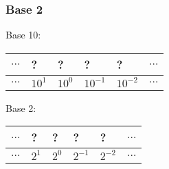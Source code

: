 \begin{frame}

\frametitle{Base 2}

\renewcommand*{\arraystretch}{1.2}

\begin{center}

Base 10:

\vspace{0.2in}

\begin{tabular}{c|P{0.3in}|P{0.3in}|P{0.3in}|P{0.3in}|c}
\hline
$\ldots$ & ? & ? & ? & ? & $\ldots$ \\\hline
$\ldots$ & $10^1$ & $10^0$ & $10^{-1}$ & $10^{-2}$ & $\ldots$ \\\hline
\end{tabular}

\vspace{\fill}

Base 2:

\vspace{0.2in}

\begin{tabular}{c|P{0.3in}|P{0.3in}|P{0.3in}|P{0.3in}|c}
\hline
$\ldots$ & ? & ? & ? & ? & $\ldots$ \\\hline
$\ldots$ & $2^1$ & $2^0$ & $2^{-1}$ & $2^{-2}$ & $\ldots$ \\\hline
\end{tabular}
\end{center}

\end{frame}

